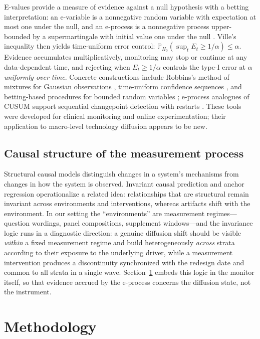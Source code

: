 \documentclass[review,authoryear,12pt]{elsarticle}
\newcommand{\Prob}{\mathbb{P}}
\begin{document}
E-values provide a measure of evidence against a null hypothesis with a betting interpretation: an e-variable is a nonnegative random variable with expectation at most one under the null, and an e-process is a nonnegative process upper-bounded by a supermartingale with initial value one under the null \citep{shafer2019,vovk2021,ramdas2023,grunwald2024}. Ville's inequality then yields time-uniform error control: $\Prob_{H_0}(\sup_t E_t \ge 1/\alpha) \le \alpha$. Evidence accumulates multiplicatively, monitoring may stop or continue at any data-dependent time, and rejecting when $E_t \ge 1/\alpha$ controls the type-I error at $\alpha$ \emph{uniformly over time}. Concrete constructions include Robbins's method of mixtures for Gaussian observations \citep{robbins1970}, time-uniform confidence sequences \citep{howard2021}, and betting-based procedures for bounded random variables \citep{waudbysmith2024}; e-process analogues of CUSUM support sequential changepoint detection with restarts \citep{page1954,shin2023}. These tools were developed for clinical monitoring and online experimentation; their application to macro-level technology diffusion appears to be new.

\subsection{Causal structure of the measurement process}

Structural causal models \citep{pearl2009} distinguish changes in a system's mechanisms from changes in how the system is observed. Invariant causal prediction \citep{peters2016} and anchor regression \citep{rothenhausler2021} operationalize a related idea: relationships that are structural remain invariant across environments and interventions, whereas artifacts shift with the environment. In our setting the ``environments'' are measurement regimes---question wordings, panel compositions, supplement windows---and the invariance logic runs in a diagnostic direction: a genuine diffusion shift should be visible \emph{within} a fixed measurement regime and build heterogeneously \emph{across} strata according to their exposure to the underlying driver, while a measurement intervention produces a discontinuity synchronized with the redesign date and common to all strata in a single wave. Section~\ref{sec:method} embeds this logic in the monitor itself, so that evidence accrued by the e-process concerns the diffusion state, not the instrument.

\section{Methodology}
\label{sec:method}
\end{document}
